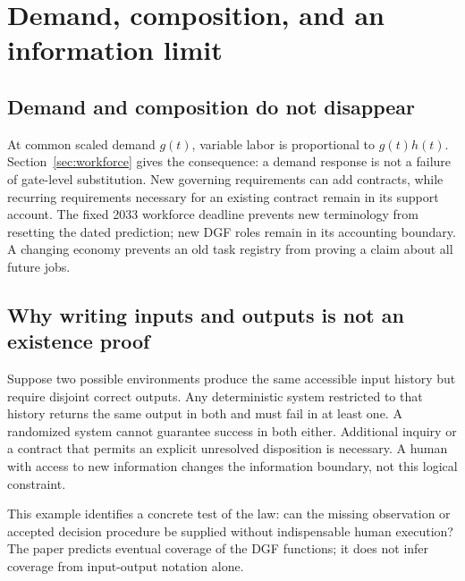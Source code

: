 \section{Demand, composition, and an information limit}
\label{app:limits}

\subsection{Demand and composition do not disappear}

At common scaled demand $g(t)$, variable labor is proportional to $g(t)h(t)$. Section~\ref{sec:workforce} gives the consequence: a demand response is not a failure of gate-level
substitution. New governing
requirements can add contracts, while recurring requirements necessary for an existing contract remain
in its support account. The fixed 2033 workforce deadline prevents new terminology from resetting the dated
prediction; new DGF roles remain in its accounting boundary. A changing economy prevents an old task
registry from proving a claim about all future jobs.

\subsection{Why writing inputs and outputs is not an existence proof}

Suppose two possible environments produce the same accessible input history but require disjoint
correct outputs. Any deterministic system restricted to that history returns the same output in both
and must fail in at least one. A randomized system cannot guarantee success in both either. Additional
inquiry or a contract that permits an explicit unresolved disposition is necessary. A human with access
to new information changes the information boundary, not this logical constraint.

This example identifies a concrete test of the law: can the missing observation or accepted decision
procedure be supplied without indispensable human execution? The paper predicts eventual coverage of
the DGF functions; it does not infer coverage from input-output notation alone.
